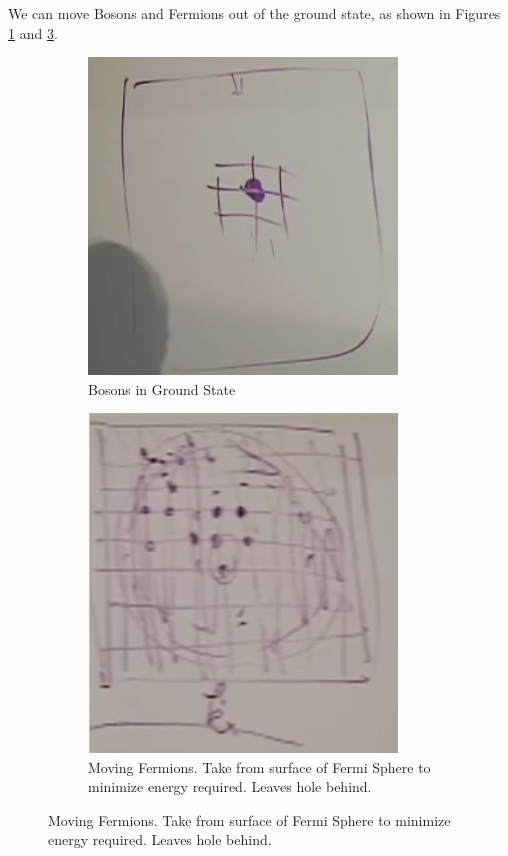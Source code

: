 \documentclass[]{article}
\begin{document}
We can move Bosons and Fermions out of the ground state, as shown in Figures \ref{fig:bosons:move:ground:state} and \ref{fig:fermions:move:ground:state}.
\begin{figure}[H]
	\caption{Moving Bosons and Fermions from lowest state}
	\begin{subfigure}{0.5\textwidth}
		\caption{Bosons in Ground State}\label{fig:bosons:move:ground:state}
		\includegraphics[width=0.9\textwidth]{bosons-ground-state}
	\end{subfigure}
	\begin{subfigure}{0.5\textwidth}
		\caption{Moving Fermions. Take from surface of Fermi Sphere to minimize energy required. Leaves hole behind.}\label{fig:fermions:move:ground:state}
		\includegraphics[width=0.9\textwidth]{moving-outside-fermi}
	\end{subfigure}
\end{figure}
\end{document}
